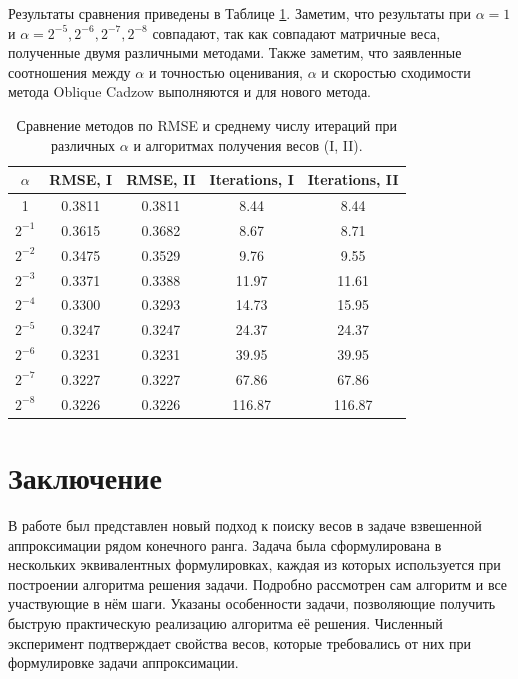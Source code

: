 \documentclass[10pt]{article}
\begin{document}
Результаты сравнения приведены в Таблице \ref{fintable}. Заметим, что результаты при $\alpha = 1$ и $\alpha = 2^{-5}, 2^{-6}, 2^{-7}, 2^{-8}$ совпадают, так как совпадают матричные веса, полученные двумя различными методами. Также заметим, что заявленные соотношения между $\alpha$ и точностью оценивания, $\alpha$ и скоростью сходимости метода Oblique Cadzow выполняются и для нового метода.

\begin{table}[!hhh]
	\caption{Сравнение методов по RMSE и среднему числу итераций при различных $\alpha$ и алгоритмах получения весов (I, II).}\label{fintable}
	\begin{center}
		\begin{tabular}{|c|c|c|c|c|}
			\hline $\alpha$ & RMSE, I & RMSE, II & Iterations, I & Iterations, II \\ 
			\hline 1 & 0.3811 & 0.3811 & 8.44 & 8.44 \\ 
			\hline $2^{-1}$ & 0.3615 & 0.3682 & 8.67 & 8.71 \\ 
			\hline $2^{-2}$ & 0.3475 & 0.3529 & 9.76 & 9.55 \\ 
			\hline $2^{-3}$ & 0.3371 & 0.3388 & 11.97 & 11.61 \\ 
			\hline $2^{-4}$ & 0.3300 & 0.3293 & 14.73 & 15.95 \\ 
			\hline $2^{-5}$ & 0.3247 & 0.3247 & 24.37 & 24.37 \\ 
			\hline $2^{-6}$ & 0.3231 & 0.3231 & 39.95 & 39.95 \\ 
			\hline $2^{-7}$ & 0.3227 & 0.3227 & 67.86 & 67.86 \\ 
			\hline $2^{-8}$ & 0.3226 & 0.3226 & 116.87 & 116.87 \\ 
			\hline 
		\end{tabular} 

	\end{center}
\end{table}

\section*{Заключение}

В работе был представлен новый подход к поиску весов в задаче взвешенной аппроксимации рядом конечного ранга. Задача была сформулирована в нескольких эквивалентных формулировках, каждая из которых используется при построении алгоритма решения задачи. Подробно рассмотрен сам алгоритм и все участвующие в нём шаги. Указаны особенности задачи, позволяющие получить быструю практическую реализацию алгоритма её решения. Численный эксперимент подтверждает свойства весов, которые требовались от них при формулировке задачи аппроксимации.
\end{document}

